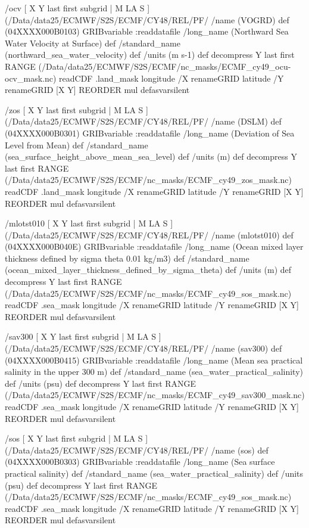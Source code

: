 \begin{ingrid}
/ocv { [ X Y last first subgrid | M LA S ] (/Data/data25/ECMWF/S2S/ECMF/CY48/REL/PF/%
/name (VOGRD) def
(04XXXX000B0103) GRIBvariable
:readdatafile
/long_name (Northward Sea Water Velocity at Surface) def
/standard_name (northward_sea_water_velocity) def
/units (m s-1) def
decompress
 Y last first RANGE
 (/Data/data25/ECMWF/S2S/ECMF/nc_masks/ECMF_cy49_ocu-ocv_mask.nc) readCDF .land_mask
   longitude /X renameGRID
   latitude /Y renameGRID
   [X Y] REORDER
mul
} defasvarsilent

/zos { [ X Y last first subgrid | M LA S ] (/Data/data25/ECMWF/S2S/ECMF/CY48/REL/PF/%
/name (DSLM) def
(04XXXX000B0301) GRIBvariable
:readdatafile
/long_name (Deviation of Sea Level from Mean) def
/standard_name (sea_surface_height_above_mean_sea_level) def
/units (m) def
decompress
Y last first RANGE
 (/Data/data25/ECMWF/S2S/ECMF/nc_masks/ECMF_cy49_zos_mask.nc) readCDF .land_mask
   longitude /X renameGRID
   latitude /Y renameGRID
   [X Y] REORDER
mul
} defasvarsilent

/mlotst010 { [ X Y last first subgrid | M LA S ] (/Data/data25/ECMWF/S2S/ECMF/CY48/REL/PF/%
/name (mlotst010) def
(04XXXX000B040E) GRIBvariable
:readdatafile
/long_name (Ocean mixed layer thickness defined by sigma theta 0.01 kg/m3) def
/standard_name (ocean_mixed_layer_thickness_defined_by_sigma_theta) def
/units (m) def
decompress
 Y last first RANGE
 (/Data/data25/ECMWF/S2S/ECMF/nc_masks/ECMF_cy49_sos_mask.nc) readCDF .sea_mask
   longitude /X renameGRID
   latitude /Y renameGRID
   [X Y] REORDER
mul
} defasvarsilent

/sav300 { [ X Y last first subgrid | M LA S ] (/Data/data25/ECMWF/S2S/ECMF/CY48/REL/PF/%
/name (sav300) def
(04XXXX000B0415) GRIBvariable
:readdatafile
/long_name (Mean sea practical salinity in the upper 300 m) def
/standard_name (sea_water_practical_salinity) def
/units (psu) def
decompress
 Y last first RANGE
 (/Data/data25/ECMWF/S2S/ECMF/nc_masks/ECMF_cy49_sav300_mask.nc) readCDF .sea_mask
   longitude /X renameGRID
   latitude /Y renameGRID
   [X Y] REORDER
mul
} defasvarsilent


/sos { [ X Y last first subgrid | M LA S ] (/Data/data25/ECMWF/S2S/ECMF/CY48/REL/PF/%
/name (sos) def
(04XXXX000B0303) GRIBvariable
:readdatafile
/long_name (Sea surface practical salinity) def
/standard_name (sea_water_practical_salinity) def
/units (psu) def
decompress
 Y last first RANGE
 (/Data/data25/ECMWF/S2S/ECMF/nc_masks/ECMF_cy49_sos_mask.nc) readCDF .sea_mask
   longitude /X renameGRID
   latitude /Y renameGRID
   [X Y] REORDER
mul
} defasvarsilent


\end{ingrid}
